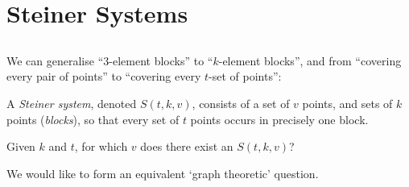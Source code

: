 \section{Steiner Systems}
\subsection{}

\begin{frame}

We can generalise ``$3$-element blocks'' to ``$k$-element blocks'', and
from ``covering every pair of points'' to ``covering every $t$-set of points'':

\pause

\begin{definition}
A {\em Steiner system}, denoted $S(t, k, v)$, consists of a set of $v$ points,
and sets of $k$ points ({\em blocks}), so that every set of $t$ points occurs
in precisely one block.
\end{definition}

\pause

\begin{problem}
Given $k$ and $t$, for which $v$ does there exist an $S(t, k, v)$?
\end{problem}

\pause
We would like to form an equivalent `graph theoretic' question.

\end{frame}

